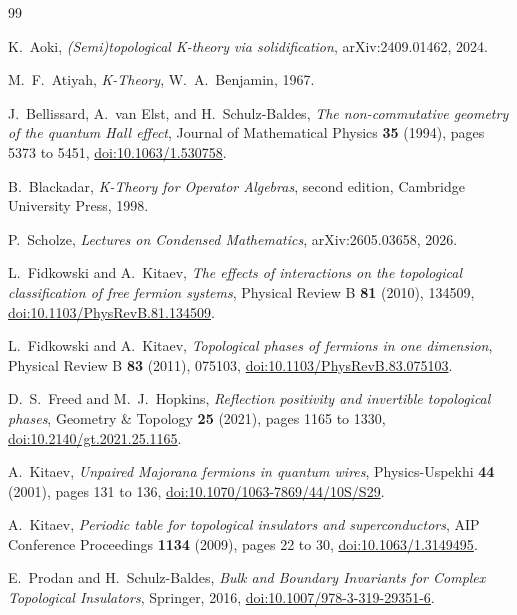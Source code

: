 \documentclass[12pt]{article}
\theoremstyle{definition}
\theoremstyle{remark}
\begin{document}
\begin{thebibliography}{99}

K.~Aoki,
\emph{(Semi)topological K-theory via solidification},
arXiv:2409.01462, 2024.

M.~F.~Atiyah,
\emph{K-Theory},
W.~A.~Benjamin, 1967.

J.~Bellissard, A.~van Elst, and H.~Schulz-Baldes,
\emph{The non-commutative geometry of the quantum Hall effect},
Journal of Mathematical Physics \textbf{35} (1994), pages 5373 to 5451,
\href{https://doi.org/10.1063/1.530758}{doi:10.1063/1.530758}.

B.~Blackadar,
\emph{K-Theory for Operator Algebras}, second edition,
Cambridge University Press, 1998.

P.~Scholze,
\emph{Lectures on Condensed Mathematics},
arXiv:2605.03658, 2026.

L.~Fidkowski and A.~Kitaev,
\emph{The effects of interactions on the topological classification of free
fermion systems},
Physical Review B \textbf{81} (2010), 134509,
\href{https://doi.org/10.1103/PhysRevB.81.134509}{doi:10.1103/PhysRevB.81.134509}.

L.~Fidkowski and A.~Kitaev,
\emph{Topological phases of fermions in one dimension},
Physical Review B \textbf{83} (2011), 075103,
\href{https://doi.org/10.1103/PhysRevB.83.075103}{doi:10.1103/PhysRevB.83.075103}.

D.~S.~Freed and M.~J.~Hopkins,
\emph{Reflection positivity and invertible topological phases},
Geometry \& Topology \textbf{25} (2021), pages 1165 to 1330,
\href{https://doi.org/10.2140/gt.2021.25.1165}{doi:10.2140/gt.2021.25.1165}.

A.~Kitaev,
\emph{Unpaired Majorana fermions in quantum wires},
Physics-Uspekhi \textbf{44} (2001), pages 131 to 136,
\href{https://doi.org/10.1070/1063-7869/44/10S/S29}{doi:10.1070/1063-7869/44/10S/S29}.

A.~Kitaev,
\emph{Periodic table for topological insulators and superconductors},
AIP Conference Proceedings \textbf{1134} (2009), pages 22 to 30,
\href{https://doi.org/10.1063/1.3149495}{doi:10.1063/1.3149495}.

E.~Prodan and H.~Schulz-Baldes,
\emph{Bulk and Boundary Invariants for Complex Topological Insulators},
Springer, 2016,
\href{https://doi.org/10.1007/978-3-319-29351-6}{doi:10.1007/978-3-319-29351-6}.


\end{thebibliography}
\end{document}
